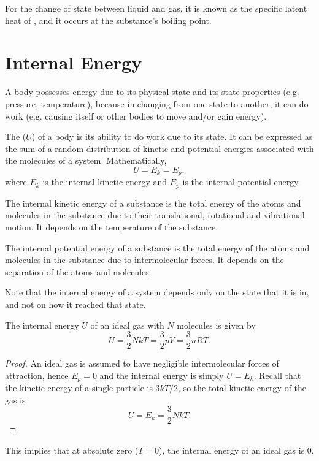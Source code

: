 For the change of state between liquid and gas, it is known as the specific latent heat of , and it occurs at the substance's boiling point.

\section{Internal Energy}

A body possesses energy due to its physical state and its state properties (e.g. pressure, temperature), because in changing from one state to another, it can do work (e.g. causing itself or other bodies to move and/or gain energy).

\begin{definition}
    The  ($U$) of a body is its ability to do work due to its state. It can be expressed as the sum of a random distribution of kinetic and potential energies associated with the molecules of a system. Mathematically, \[U = E_k = E_p,\] where $E_k$ is the internal kinetic energy and $E_p$ is the internal potential energy.
\end{definition}

The internal kinetic energy of a substance is the total energy of the atoms and molecules in the substance due to their translational, rotational and vibrational motion. It depends on the temperature of the substance.

The internal potential energy of a substance is the total energy of the atoms and molecules in the substance due to intermolecular forces. It depends on the separation of the atoms and molecules.

Note that the internal energy of a system depends only on the state that it is in, and not on how it reached that state.

\begin{proposition}
    The internal energy $U$ of an ideal gas with $N$ molecules is given by \[U = \frac32 NkT = \frac32 pV = \frac32 nRT.\]
\end{proposition}
\begin{proof}
    An ideal gas is assumed to have negligible intermolecular forces of attraction, hence $E_p = 0$ and the internal energy is simply $U = E_k$. Recall that the kinetic energy of a single particle is $3kT/2$, so the total kinetic energy of the gas is \[U = E_k = \frac32 NkT.\]
\end{proof}

This implies that at absolute zero ($T = 0$), the internal energy of an ideal gas is 0.

